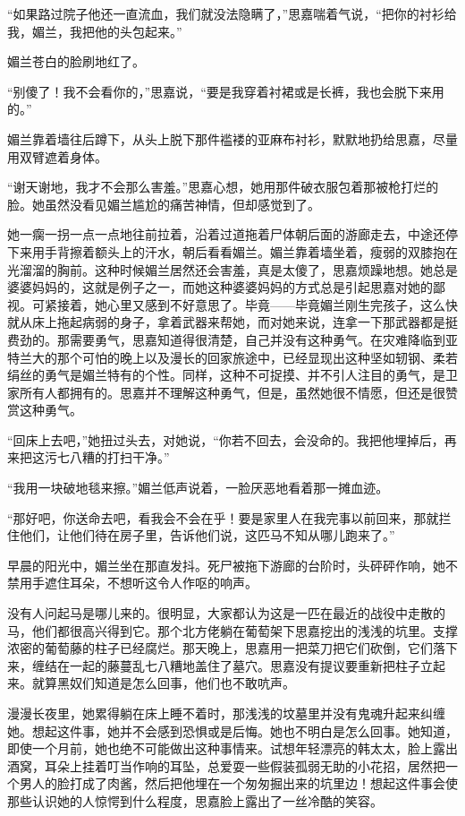 \par “如果路过院子他还一直流血，我们就没法隐瞒了，”思嘉喘着气说，“把你的衬衫给我，媚兰，我把他的头包起来。”
\par 媚兰苍白的脸刷地红了。
\par “别傻了！我不会看你的，”思嘉说，“要是我穿着衬裙或是长裤，我也会脱下来用的。”
\par 媚兰靠着墙往后蹲下，从头上脱下那件褴褛的亚麻布衬衫，默默地扔给思嘉，尽量用双臂遮着身体。
\par “谢天谢地，我才不会那么害羞。”思嘉心想，她用那件破衣服包着那被枪打烂的脸。她虽然没看见媚兰尴尬的痛苦神情，但却感觉到了。
\par 她一瘸一拐一点一点地往前拉着，沿着过道拖着尸体朝后面的游廊走去，中途还停下来用手背擦着额头上的汗水，朝后看看媚兰。媚兰靠着墙坐着，瘦弱的双膝抱在光溜溜的胸前。这种时候媚兰居然还会害羞，真是太傻了，思嘉烦躁地想。她总是婆婆妈妈的，这就是例子之一，而她这种婆婆妈妈的方式总是引起思嘉对她的鄙视。可紧接着，她心里又感到不好意思了。毕竟——毕竟媚兰刚生完孩子，这么快就从床上拖起病弱的身子，拿着武器来帮她，而对她来说，连拿一下那武器都是挺费劲的。那需要勇气，思嘉知道得很清楚，自己并没有这种勇气。在灾难降临到亚特兰大的那个可怕的晚上以及漫长的回家旅途中，已经显现出这种坚如轫钢、柔若绢丝的勇气是媚兰特有的个性。同样，这种不可捉摸、并不引人注目的勇气，是卫家所有人都拥有的。思嘉并不理解这种勇气，但是，虽然她很不情愿，但还是很赞赏这种勇气。
\par “回床上去吧，”她扭过头去，对她说，“你若不回去，会没命的。我把他埋掉后，再来把这污七八糟的打扫干净。”
\par “我用一块破地毯来擦。”媚兰低声说着，一脸厌恶地看着那一摊血迹。
\par “那好吧，你送命去吧，看我会不会在乎！要是家里人在我完事以前回来，那就拦住他们，让他们待在房子里，告诉他们说，这匹马不知从哪儿跑来了。”
\par 早晨的阳光中，媚兰坐在那直发抖。死尸被拖下游廊的台阶时，头砰砰作响，她不禁用手遮住耳朵，不想听这令人作呕的响声。
\par 没有人问起马是哪儿来的。很明显，大家都认为这是一匹在最近的战役中走散的马，他们都很高兴得到它。那个北方佬躺在葡萄架下思嘉挖出的浅浅的坑里。支撑浓密的葡萄藤的柱子已经腐烂。那天晚上，思嘉用一把菜刀把它们砍倒，它们落下来，缠结在一起的藤蔓乱七八糟地盖住了墓穴。思嘉没有提议要重新把柱子立起来。就算黑奴们知道是怎么回事，他们也不敢吭声。
\par 漫漫长夜里，她累得躺在床上睡不着时，那浅浅的坟墓里并没有鬼魂升起来纠缠她。想起这件事，她并不会感到恐惧或是后悔。她也不明白是怎么回事。她知道，即使一个月前，她也绝不可能做出这种事情来。试想年轻漂亮的韩太太，脸上露出酒窝，耳朵上挂着叮当作响的耳坠，总爱耍一些假装孤弱无助的小花招，居然把一个男人的脸打成了肉酱，然后把他埋在一个匆匆掘出来的坑里边！想起这件事会使那些认识她的人惊愕到什么程度，思嘉脸上露出了一丝冷酷的笑容。
